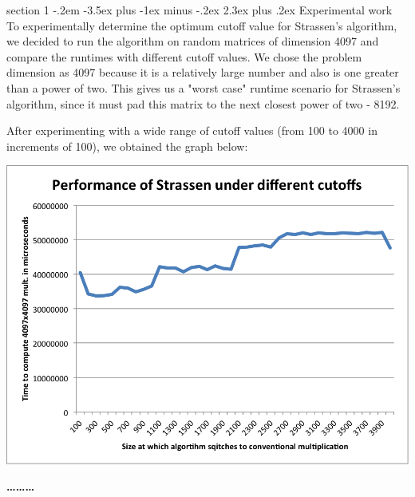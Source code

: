 \documentclass[12pt]{article}
\makeatletter
\newenvironment{problem}{\@startsection
       {section}
       {1}
       {-.2em}
       {-3.5ex plus -1ex minus -.2ex}
       {2.3ex plus .2ex}
       {\pagebreak[3]%
       \large\bf\noindent{Problem }
       }
       }
       {%
       \begin{center}\large\bf \ldots\ldots\ldots\end{center}}
\makeatother
\begin{document}
\begin{problem}{}
Experimental work\\

To experimentally determine the optimum cutoff value for Strassen's algorithm, we decided to run the algorithm on random matrices of dimension 4097 and compare the runtimes with different cutoff values.  We chose the problem dimension as 4097 because it is a relatively large number and also is one greater than a power of two.  This gives us a "worst case" runtime scenario for Strassen's algorithm, since it must pad this matrix to the next closest power of two - 8192.

After experimenting with a wide range of cutoff values (from 100 to 4000 in increments of 100), we obtained the graph below:
\begin{center}
\includegraphics[scale=0.8]{figs/benchmark-1.png}
\end{center}


\end{problem}
\end{document}
